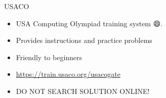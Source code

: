 \begin{frame}{USACO}
\begin{itemize}
  \item USA Computing Olympiad training system 😄.
  \item Provides instructions and practice problems
  \item Friendly to beginners
  \item \url {https://train.usaco.org/usacogate}
  \item \Large{DO NOT SEARCH SOLUTION ONLINE!}
\end{itemize}
\end{frame}

